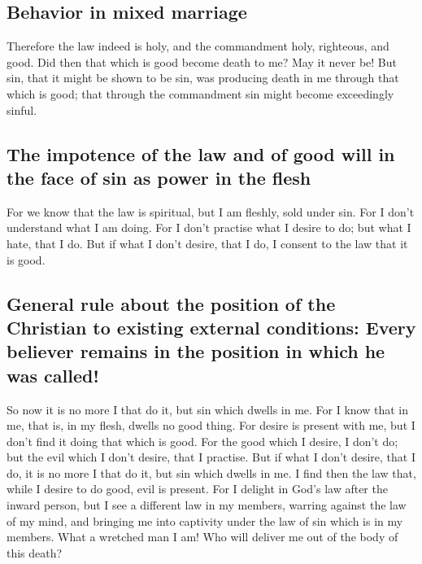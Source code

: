 \hypertarget{behavior-in-mixed-marriage}{%
\subsection{Behavior in mixed
marriage}\label{behavior-in-mixed-marriage}}

 Therefore the law indeed is holy, and the commandment
holy, righteous, and good.  Did then that which is good
become death to me? May it never be! But sin, that it might be shown to
be sin, was producing death in me through that which is good; that
through the commandment sin might become exceedingly sinful.

\hypertarget{the-impotence-of-the-law-and-of-good-will-in-the-face-of-sin-as-power-in-the-flesh}{%
\subsection{The impotence of the law and of good will in the face of sin
as power in the
flesh}\label{the-impotence-of-the-law-and-of-good-will-in-the-face-of-sin-as-power-in-the-flesh}}

 For we know that the law is spiritual, but I am fleshly,
sold under sin.  For I don't understand what I am doing.
For I don't practise what I desire to do; but what I hate, that I do.
 But if what I don't desire, that I do, I consent to the
law that it is good.

\hypertarget{general-rule-about-the-position-of-the-christian-to-existing-external-conditions-every-believer-remains-in-the-position-in-which-he-was-called}{%
\subsection{General rule about the position of the Christian to existing
external conditions: Every believer remains in the position in which he
was
called!}\label{general-rule-about-the-position-of-the-christian-to-existing-external-conditions-every-believer-remains-in-the-position-in-which-he-was-called}}

 So now it is no more I that do it, but sin which dwells
in me.  For I know that in me, that is, in my flesh,
dwells no good thing. For desire is present with me, but I don't find it
doing that which is good.  For the good which I desire, I
don't do; but the evil which I don't desire, that I practise.
 But if what I don't desire, that I do, it is no more I
that do it, but sin which dwells in me.  I find then the
law that, while I desire to do good, evil is present. 
For I delight in God's law after the inward person,  but
I see a different law in my members, warring against the law of my mind,
and bringing me into captivity under the law of sin which is in my
members.  What a wretched man I am! Who will deliver me
out of the body of this death?

